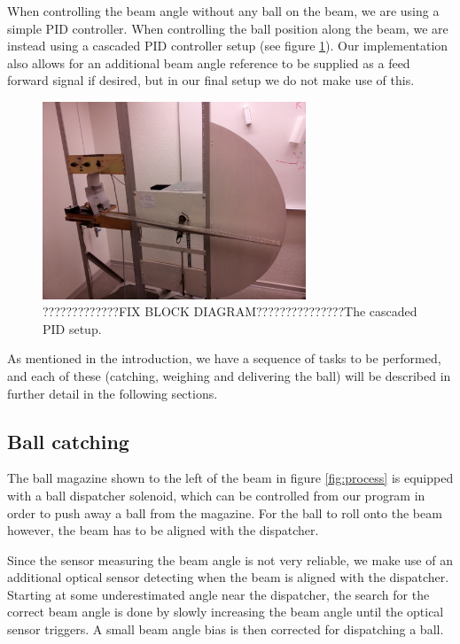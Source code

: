 When controlling the beam angle without any ball on the beam, we are using a simple PID controller.
When controlling the ball position along the beam, we are instead using a cascaded PID controller setup (see figure \ref{fig:cascaded_pid}).
Our implementation also allows for an additional beam angle reference to be supplied as a feed forward signal if desired, but in our final setup we do not make use of this.
\begin{figure}
\centering
\includegraphics[width=0.7\textwidth]{figures/process_fig.jpg}
\caption{?????????????FIX BLOCK DIAGRAM???????????????The cascaded PID setup.}\label{fig:cascaded_pid}
\end{figure}

As mentioned in the introduction, we have a sequence of tasks to be performed, and each of these (catching, weighing and delivering the ball) will be described in further detail in the following sections.

\subsection{Ball catching}\label{sec:ball_catching}
The ball magazine shown to the left of the beam in figure \ref{fig:process} is equipped with a ball dispatcher solenoid, which can be controlled from our program in order to push away a ball from the magazine.
For the ball to roll onto the beam however, the beam has to be aligned with the dispatcher.

Since the sensor measuring the beam angle is not very reliable, we make use of an additional optical sensor detecting when the beam is aligned with the dispatcher.
Starting at some underestimated angle near the dispatcher, the search for the correct beam angle is done by slowly increasing the beam angle until the optical sensor triggers. A small beam angle bias is then corrected for dispatching a ball.

